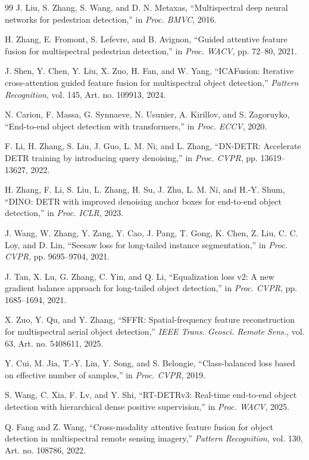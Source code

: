 \documentclass[letterpaper,journal]{IEEEtran}
\begin{document}
\begin{thebibliography}{99}
J. Liu, S. Zhang, S. Wang, and D. N. Metaxas, ``Multispectral deep neural networks for pedestrian detection,'' in \emph{Proc. BMVC}, 2016.


H. Zhang, E. Fromont, S. Lefevre, and B. Avignon, ``Guided attentive feature fusion for multispectral pedestrian detection,'' in \emph{Proc. WACV}, pp. 72--80, 2021.


J. Shen, Y. Chen, Y. Liu, X. Zuo, H. Fan, and W. Yang, ``ICAFusion: Iterative cross-attention guided feature fusion for multispectral object detection,'' \emph{Pattern Recognition}, vol. 145, Art. no. 109913, 2024.


N. Carion, F. Massa, G. Synnaeve, N. Usunier, A. Kirillov, and S. Zagoruyko, ``End-to-end object detection with transformers,'' in \emph{Proc. ECCV}, 2020.


F. Li, H. Zhang, S. Liu, J. Guo, L. M. Ni, and L. Zhang, ``DN-DETR: Accelerate DETR training by introducing query denoising,'' in \emph{Proc. CVPR}, pp. 13619--13627, 2022.


H. Zhang, F. Li, S. Liu, L. Zhang, H. Su, J. Zhu, L. M. Ni, and H.-Y. Shum, ``DINO: DETR with improved denoising anchor boxes for end-to-end object detection,'' in \emph{Proc. ICLR}, 2023.


J. Wang, W. Zhang, Y. Zang, Y. Cao, J. Pang, T. Gong, K. Chen, Z. Liu, C. C. Loy, and D. Lin, ``Seesaw loss for long-tailed instance segmentation,'' in \emph{Proc. CVPR}, pp. 9695--9704, 2021.


J. Tan, X. Lu, G. Zhang, C. Yin, and Q. Li, ``Equalization loss v2: A new gradient balance approach for long-tailed object detection,'' in \emph{Proc. CVPR}, pp. 1685--1694, 2021.


X. Zuo, Y. Qu, and Y. Zhang, ``SFFR: Spatial-frequency feature reconstruction for multispectral aerial object detection,'' \emph{IEEE Trans. Geosci. Remote Sens.}, vol. 63, Art. no. 5408611, 2025.


Y. Cui, M. Jia, T.-Y. Lin, Y. Song, and S. Belongie, ``Class-balanced loss based on effective number of samples,'' in \emph{Proc. CVPR}, 2019.


S. Wang, C. Xia, F. Lv, and Y. Shi, ``RT-DETRv3: Real-time end-to-end object detection with hierarchical dense positive supervision,'' in \emph{Proc. WACV}, 2025.


Q. Fang and Z. Wang, ``Cross-modality attentive feature fusion for object detection in multispectral remote sensing imagery,'' \emph{Pattern Recognition}, vol. 130, Art. no. 108786, 2022.



\end{thebibliography}
\end{document}
